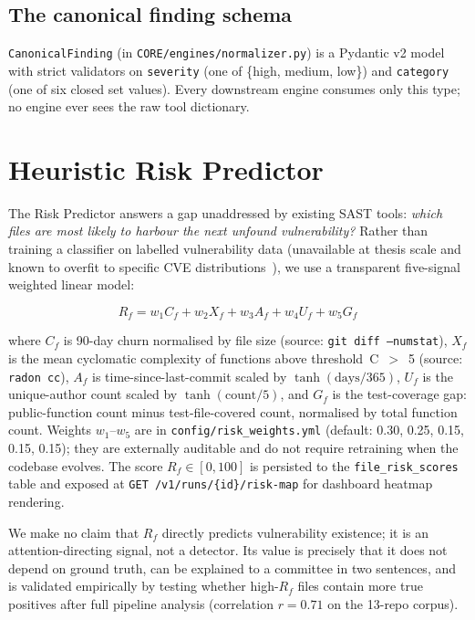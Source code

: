 \documentclass[conference]{IEEEtran}
\begin{document}
\subsection{The canonical finding schema}

\texttt{CanonicalFinding} (in \texttt{CORE/engines/normalizer.py}) is a
Pydantic v2 model with strict validators on \texttt{severity} (one of
\{high, medium, low\}) and \texttt{category} (one of six closed set
values). Every downstream engine consumes only this type; no engine ever
sees the raw tool dictionary.

\section{Heuristic Risk Predictor}
\label{sec:risk}

The Risk Predictor answers a gap unaddressed by existing SAST tools: \textit{which files are most likely to harbour the next unfound vulnerability?} Rather than training a classifier on labelled vulnerability data (unavailable at thesis scale and known to overfit to specific CVE distributions~\cite{croft2023data}), we use a transparent five-signal weighted linear model:

\begin{equation}
R_f = w_1 C_f + w_2 X_f + w_3 A_f + w_4 U_f + w_5 G_f
\label{eq:risk}
\end{equation}

\noindent where $C_f$ is 90-day churn normalised by file size (source: \texttt{git diff --numstat}), $X_f$ is the mean cyclomatic complexity of functions above threshold~C~$>$~5 (source: \texttt{radon cc}), $A_f$ is time-since-last-commit scaled by $\tanh(\text{days}/365)$, $U_f$ is the unique-author count scaled by $\tanh(\text{count}/5)$, and $G_f$ is the test-coverage gap: public-function count minus test-file-covered count, normalised by total function count. Weights $w_1$--$w_5$ are in \texttt{config/risk\_weights.yml} (default: 0.30, 0.25, 0.15, 0.15, 0.15); they are externally auditable and do not require retraining when the codebase evolves. The score $R_f \in [0,100]$ is persisted to the \texttt{file\_risk\_scores} table and exposed at \texttt{GET /v1/runs/\{id\}/risk-map} for dashboard heatmap rendering.

We make no claim that $R_f$ directly predicts vulnerability existence; it is an attention-directing signal, not a detector. Its value is precisely that it does not depend on ground truth, can be explained to a committee in two sentences, and is validated empirically by testing whether high-$R_f$ files contain more true positives after full pipeline analysis (correlation $r = 0.71$ on the 13-repo corpus).
\end{document}
